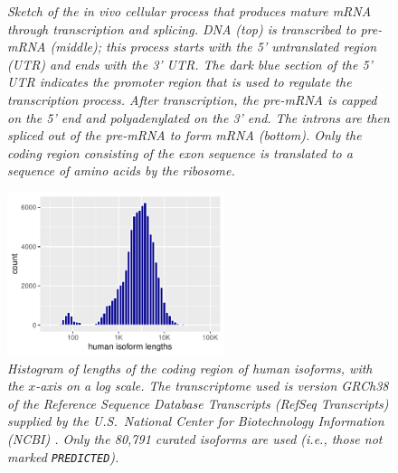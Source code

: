 \documentclass[11pt]{report}
\newcommand{\mycaption}[2]{\caption{\small\it #2}\label{#1}}
\begin{document}
\begin{figure}[t!]
  \mycaption{fig:transcriptome-splicing}{Sketch of the \textit{in
      vivo} cellular process that produces mature mRNA through
    transcription and splicing.  DNA (top) is transcribed to pre-mRNA
    (middle); this process starts with the 5' untranslated region
    (UTR) and ends with the 3' UTR.  The dark blue section of the 5'
    UTR indicates the promoter region that is used to regulate the
    transcription process.  After transcription, the pre-mRNA is
    capped on the 5' end and polyadenylated on the 3' end.  The
    introns are then spliced out of the pre-mRNA to form mRNA
    (bottom).  Only the coding region consisting of the exon sequence
    is translated to a sequence of amino acids by the ribosome.}
\end{figure}

\begin{figure}[t!]
  \centering
  \includegraphics[width=2.5in]{../../img/isoform-human-length-histogram.pdf}
  \mycaption{fig:iso-lengths}{Histogram of lengths of the coding
    region of human isoforms, with the $x$-axis on a log scale. The
    transcriptome used is version GRCh38 of the Reference Sequence
    Database Transcripts (RefSeq Transcripts) supplied by the U.S.\
    National Center for Biotechnology Information (NCBI)
    \citep{oleary2016reference}. Only the 80,791 curated isoforms are
    used (i.e., those not marked {\small \texttt{PREDICTED}).}}
\end{figure}
\end{document}
